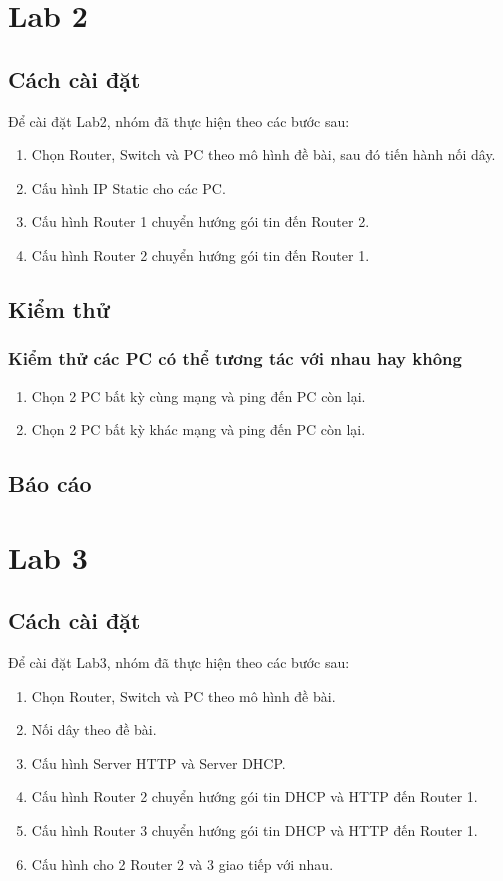 \documentclass[]{article}
\begin{document}
\section{Lab 2}
\subsection{Cách cài đặt}
Để cài đặt Lab2, nhóm đã thực hiện theo các bước sau:
\begin{enumerate}
\item Chọn Router, Switch và PC theo mô hình đề bài, sau đó tiến hành nối dây.
\item Cấu hình IP Static cho các PC.
\item Cấu hình Router 1 chuyển hướng gói tin đến Router 2.
\item Cấu hình Router 2 chuyển hướng gói tin đến Router 1.
\end{enumerate}
\subsection{Kiểm thử}
\subsubsection{Kiểm thử các PC có thể tương tác với nhau hay không}
\begin{enumerate}
    \item Chọn 2 PC bất kỳ cùng mạng và ping đến PC còn lại.
    \item Chọn 2 PC bất kỳ khác mạng và ping đến PC còn lại.
\end{enumerate}
\subsection{Báo cáo}

\section{Lab 3}
\subsection{Cách cài đặt}
Để cài đặt Lab3, nhóm đã thực hiện theo các bước sau:
\begin{enumerate}
    \item Chọn Router, Switch và PC theo mô hình đề bài.
    \item Nối dây theo đề bài.
    \item Cấu hình Server HTTP và Server DHCP.
    \item Cấu hình Router 2 chuyển hướng gói tin DHCP và HTTP đến Router 1.
    \item Cấu hình Router 3 chuyển hướng gói tin DHCP và HTTP đến Router 1.
    \item Cấu hình cho 2 Router 2 và 3 giao tiếp với nhau.
\end{enumerate}
\end{document}
